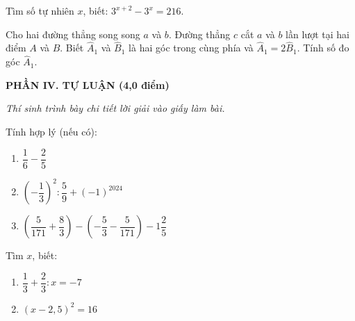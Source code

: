 \documentclass[12pt,a4paper]{article}
\begin{document}
\vspace{1mm}
\begin{ex}
Tìm số tự nhiên $x$, biết: $3^{x+2} - 3^x = 216$. 
\end{ex}

\begin{ex}
Cho hai đường thẳng song song $a$ và $b$. Đường thẳng $c$ cắt $a$ và $b$ lần lượt tại hai điểm $A$ và $B$. Biết $\widehat{A}_1$ và $\widehat{B}_1$ là hai góc trong cùng phía và $\widehat{A}_1 = 2\widehat{B}_1$. Tính số đo góc $\widehat{A}_1$. 
\end{ex}


\newpage
\setcounter{ex}{0}
\noindent\textbf{\large PHẦN IV. TỰ LUẬN (4,0 điểm)}

\textit{Thí sinh trình bày chi tiết lời giải vào giấy làm bài.}

\vspace{1mm}
\begin{ex}
Tính hợp lý (nếu có):
\begin{enumerate}[label=\textbf{\alph*)}, leftmargin=0.8cm, itemsep=1pt]
\item $\dfrac{1}{6} - \dfrac{2}{5}$
\item $\left(-\dfrac{1}{3}\right)^2 : \dfrac{5}{9} + (-1)^{2024}$
\item $\left(\dfrac{5}{171} + \dfrac{8}{3}\right) - \left(-\dfrac{5}{3} - \dfrac{5}{171}\right) - 1\dfrac{2}{5}$
\end{enumerate}
\end{ex}
\vspace{2mm}

\begin{ex}
Tìm $x$, biết:
\begin{enumerate}[label=\textbf{\alph*)}, leftmargin=0.8cm, itemsep=1pt]
\item $\dfrac{1}{3} + \dfrac{2}{3} : x = -7$
\item $(x - 2{,}5)^2 = 16$
\end{enumerate}
\end{ex}
\vspace{2mm}
\end{document}

